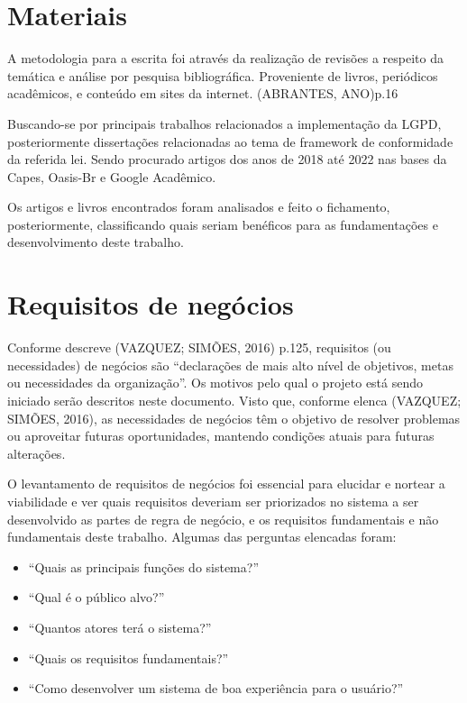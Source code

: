 \documentclass[
	12pt,				%
	openright,			%
	oneside,			%
	a4paper,			%
	english,			%
	french,				%
	spanish,			%
	brazil,				%
	]{abntex2}
\begin{document}
\section{Materiais}

A metodologia para a escrita foi através da realização de revisões a respeito da temática e análise por pesquisa bibliográfica. Proveniente de livros, periódicos acadêmicos, e conteúdo em sites da internet. (ABRANTES, ANO)p.16

Buscando-se por principais trabalhos relacionados a implementação da LGPD, posteriormente dissertações relacionadas ao tema de framework de conformidade da referida lei. Sendo procurado artigos dos anos de 2018 até 2022 nas bases da Capes, Oasis-Br e Google Acadêmico. 

Os artigos e livros encontrados foram analisados e feito o fichamento, posteriormente, classificando quais seriam benéficos para as fundamentações e desenvolvimento deste trabalho.

\section{Requisitos de negócios}

Conforme descreve (VAZQUEZ; SIMÕES, 2016) p.125, requisitos (ou necessidades) de negócios são “declarações de mais alto nível de objetivos, metas ou necessidades da organização”.  Os motivos pelo qual o projeto está sendo iniciado serão descritos neste documento. Visto que, conforme elenca   (VAZQUEZ; SIMÕES, 2016), as necessidades de negócios têm o objetivo de resolver problemas ou aproveitar futuras oportunidades, mantendo condições atuais para futuras alterações.

O levantamento de requisitos de negócios foi essencial para elucidar e nortear a viabilidade e ver quais requisitos deveriam ser priorizados no sistema a ser desenvolvido as partes de regra de negócio, e os requisitos fundamentais e não fundamentais deste trabalho. Algumas das perguntas elencadas foram:

\begin{itemize}
\item “Quais as principais funções do sistema?”
\item “Qual é o público alvo?”
\item “Quantos atores terá o sistema?”
\item “Quais os requisitos fundamentais?”
\item “Como desenvolver um sistema de boa experiência para o usuário?”
\end{itemize}
\end{document}
